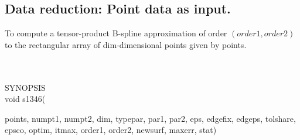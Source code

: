 \subsection{Data reduction: Point data as input.}
\begin{minipg1}
  To compute a tensor-product B-spline approximation of order $(order1,
  order2)$ to the rectangular array of {\fov dim}-dimensional points given by
  points.
\end{minipg1} \\ \\
SYNOPSIS\\
        \>void s1346(\begin{minipg3}
                {\fov points}, {\fov numpt1}, {\fov numpt2}, {\fov dim}, {\fov typepar}, {\fov par1}, {\fov par2}, {\fov eps}, {\fov edgefix}, {\fov edgeps},
                {\fov tolshare}, {\fov epsco}, {\fov optim}, {\fov itmax}, {\fov order1}, {\fov order2},
                {\fov newsurf}, {\fov maxerr}, {\fov stat})
                \end{minipg3}\\[0.3ex]

